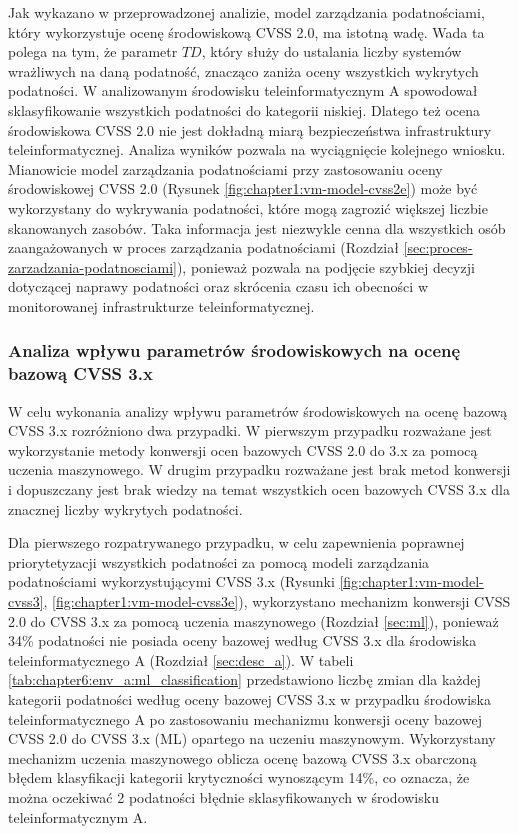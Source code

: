 \bigbreak
Jak wykazano w przeprowadzonej analizie, model zarządzania podatnościami, który wykorzystuje ocenę środowiskową CVSS 2.0, ma istotną wadę. Wada ta polega na tym, że parametr $TD$, który służy do ustalania liczby systemów wrażliwych na daną podatność, znacząco zaniża oceny wszystkich wykrytych podatności. W analizowanym środowisku teleinformatycznym A spowodował sklasyfikowanie wszystkich podatności do kategorii niskiej. Dlatego też ocena środowiskowa CVSS 2.0 nie jest dokładną miarą bezpieczeństwa infrastruktury teleinformatycznej. Analiza wyników pozwala na wyciągnięcie kolejnego wniosku. Mianowicie model zarządzania podatnościami przy zastosowaniu oceny środowiskowej CVSS 2.0 (Rysunek \ref{fig:chapter1:vm-model-cvss2e}) może być wykorzystany do wykrywania podatności, które mogą zagrozić większej liczbie skanowanych zasobów. Taka informacja jest niezwykle cenna dla wszystkich osób zaangażowanych w proces zarządzania podatnościami (Rozdział \ref{sec:proces-zarzadzania-podatnosciami}), ponieważ pozwala na podjęcie szybkiej decyzji dotyczącej naprawy podatności oraz skrócenia czasu ich obecności w monitorowanej infrastrukturze teleinformatycznej.


\subsubsection{Analiza wpływu parametrów środowiskowych na ocenę bazową CVSS 3.x}

W celu wykonania analizy wpływu parametrów środowiskowych na ocenę bazową CVSS 3.x rozróżniono dwa przypadki. W pierwszym przypadku rozważane jest wykorzystanie metody konwersji ocen bazowych CVSS 2.0 do 3.x za pomocą uczenia maszynowego. W drugim przypadku rozważane jest brak metod konwersji i dopuszczany jest brak wiedzy na temat wszystkich ocen bazowych CVSS 3.x dla znacznej liczby wykrytych podatności.

\bigbreak
Dla pierwszego rozpatrywanego przypadku, w celu zapewnienia poprawnej priorytetyzacji wszystkich podatności za pomocą modeli zarządzania podatnościami wykorzystującymi CVSS 3.x (Rysunki \ref{fig:chapter1:vm-model-cvss3}, \ref{fig:chapter1:vm-model-cvss3e}), wykorzystano mechanizm konwersji CVSS 2.0 do CVSS 3.x za pomocą uczenia maszynowego (Rozdział \ref{sec:ml}), ponieważ 34\% podatności nie posiada oceny bazowej według CVSS 3.x dla środowiska teleinformatycznego A (Rozdział \ref{sec:desc_a}). W tabeli \ref{tab:chapter6:env_a:ml_classification} przedstawiono liczbę zmian dla każdej kategorii podatności według oceny bazowej CVSS 3.x w przypadku środowiska teleinformatycznego A po zastosowaniu mechanizmu konwersji oceny bazowej CVSS 2.0 do CVSS 3.x (ML) opartego na uczeniu maszynowym. Wykorzystany mechanizm uczenia maszynowego oblicza ocenę bazową CVSS 3.x obarczoną błędem klasyfikacji kategorii krytyczności wynoszącym 14\%, co oznacza, że można oczekiwać 2 podatności błędnie sklasyfikowanych w środowisku teleinformatycznym A.


